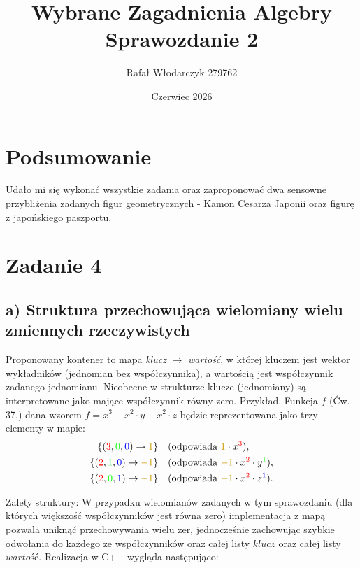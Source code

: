 \documentclass[10pt, a4paper]{article}
\title{Wybrane Zagadnienia Algebry\\Sprawozdanie 2}
\author{Rafał Włodarczyk 279762}
\date{Czerwiec 2026}
\begin{document}
\maketitle

\section*{Podsumowanie}

Udało mi się wykonać wszystkie zadania oraz zaproponować dwa sensowne przybliżenia zadanych figur geometrycznych - Kamon Cesarza Japonii oraz figurę z japońskiego paszportu. 

\section*{Zadanie 4}

\subsection*{a) Struktura przechowująca wielomiany wielu zmiennych rzeczywistych}

Proponowany kontener to mapa \textit{klucz} $\to$ \textit{wartość}, 
w której kluczem jest wektor wykładników (jednomian bez współczynnika), 
a wartością jest współczynnik zadanego jednomianu. Nieobecne w strukturze
klucze (jednomiany) są interpretowane jako mające współczynnik równy zero.
Przykład. Funkcja $f$ (Ćw. 37.) dana wzorem $f=x^3 - x^2\cdot y - x^2 \cdot z$ będzie reprezentowana jako trzy elementy w mapie:
\begin{align*}
\{({\color{red}3}, {\color{green}0}, {\color{blue}0}) \to {\color{darkyellow}1}\}  & \quad (\text{odpowiada } {\color{darkyellow}1} \cdot x^{{\color{red}3}}), \\
\{({\color{red}2}, {\color{green}1}, {\color{blue}0}) \to {\color{darkyellow}-1}\} & \quad (\text{odpowiada } {\color{darkyellow}-1} \cdot x^{{\color{red}2}} \cdot y^{{\color{green}1}}), \\
\{({\color{red}2}, {\color{green}0}, {\color{blue}1}) \to {\color{darkyellow}-1}\} & \quad (\text{odpowiada } {\color{darkyellow}-1} \cdot x^{{\color{red}2}} \cdot z^{{\color{blue}1}}).
\end{align*}

\noindent
Zalety struktury: W przypadku wielomianów zadanych w tym sprawozdaniu (dla których większość współczynników jest równa zero) implementacja z mapą pozwala
uniknąć przechowywania wielu zer, jednocześnie zachowując szybkie odwołania do każdego ze współczynników oraz całej listy $\textit{klucz}$ oraz całej listy $\textit{wartość}$.
Realizacja w C++ wygląda następująco:
\end{document}

